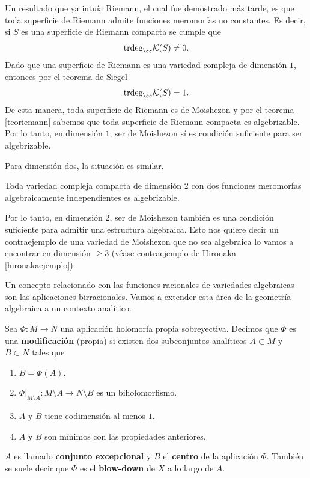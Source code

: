 Un resultado que ya intuía Riemann, el cual fue demostrado más tarde, es que toda superficie de Riemann admite funciones meromorfas no constantes. Es decir, si $S$ es una superficie de Riemann compacta se cumple que
\begin{equation*}
	\mathrm{trdeg}_\cc\mathcal{K}(S)\neq 0.
\end{equation*}
Dado que una superficie de Riemann es una variedad compleja de dimensión $1$, entonces por el teorema de Siegel
\begin{equation*}
	\mathrm{trdeg}_\cc\mathcal{K}(S)=1.
\end{equation*}
De esta manera, toda superficie de Riemann es de Moishezon y por el teorema \ref{teoriemann} sabemos que toda superficie de Riemann compacta es algebrizable. Por lo tanto, en dimensión $1$, ser de Moishezon sí es condición suficiente para ser algebrizable. 

Para dimensión dos, la situación es similar.
\begin{theorem}[Kodaira]
	Toda variedad compleja compacta de dimensión 2 con dos funciones meromorfas algebraicamente independientes es algebrizable.
\end{theorem}  
Por lo tanto, en dimensión $2$, ser de Moishezon también es una condición suficiente para admitir una estructura algebraica. Esto nos quiere decir un contraejemplo de una variedad de Moishezon que no sea algebraica lo vamos a encontrar en dimensión $\geq 3$ (véase contraejemplo de Hironaka \ref{hironakaejemplo}).

Un concepto relacionado con las funciones racionales de variedades algebraicas son las aplicaciones birracionales. Vamos a extender esta área de la geometría algebraica a un contexto analítico.

\begin{definition}[Modificación]
	Sea $\Phi:M\to N$ una aplicación holomorfa propia sobreyectiva. Decimos que $\Phi$ es una \textbf{modificación} (propia) si existen dos subconjuntos analíticos $A\subset M$ y $B\subset N$ tales que 
	\begin{enumerate}
		\item $B=\Phi(A)$.
		\item $\Phi|_{M\setminus A}:M\setminus A\to N\setminus B$ es un biholomorfismo. 
		\item $A$ y $B$ tiene codimensión al menos $1$.
		\item $A$ y $B$ son mínimos con las propiedades anteriores.
	\end{enumerate}
	$A$ es llamado \textbf{conjunto excepcional} y $B$ el \textbf{centro} de la aplicación $\Phi$. También se suele decir que $\Phi$ es el \textbf{blow-down} de $X$ a lo largo de $A$.
\end{definition}

